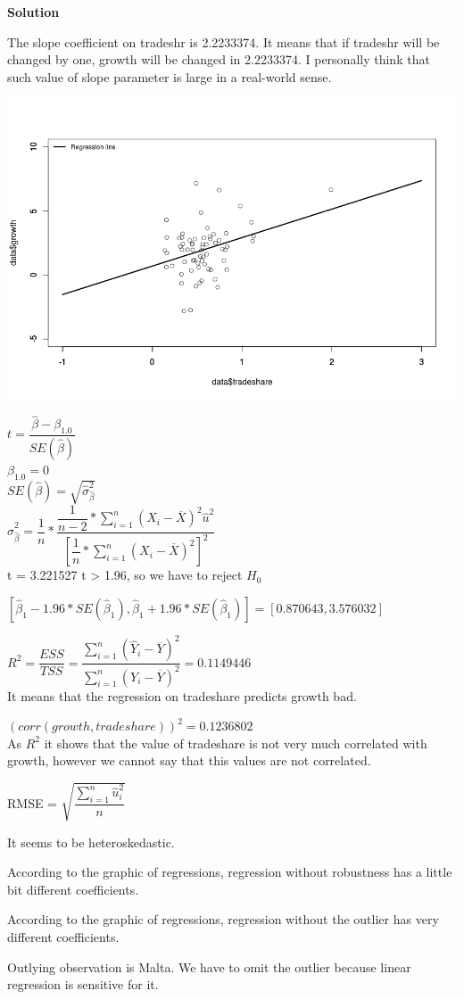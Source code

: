 \documentclass[12pt]{article}
\begin{document}
\textbf{Solution}

\begin{list}{)~}{}
\item
The slope coefficient on tradeshr is 2.2233374. It means that if tradeshr will be changed by one, growth will be changed in 2.2233374. I personally think that such value of slope parameter is large in a real-world sense.
\item
\includegraphics[width=1\textwidth]{Rplot.png}
\item
$t = \dfrac{\hat{\beta} - \beta_{1.0}}{SE(\hat{\beta})}$\\
$\beta_{1.0} = 0$\\
${SE(\hat{\beta})} = \sqrt{\hat{\sigma}^2_{\hat{\beta}}}$\\
$\hat{\sigma}^2_{\hat{\beta}} = \dfrac{1}{n} * \dfrac{\dfrac{1}{n-2} * \sum^{n}_{i = 1}(X_i - \overline{X})^2\hat{u}^2}{\left[\dfrac{1}{n} * \sum^{n}_{i = 1}(X_i-\overline{X})^2\right]^2}$\\
t = 3.221527 
t > 1.96, so we have to reject $H_0$
\item
$[\hat{\beta}_1 - 1.96*SE(\hat{\beta}_1),\hat{\beta}_1 + 1.96*SE(\hat{\beta}_1)] = [0.870643,3.576032]$
\item
$R^2 = \dfrac{ESS}{TSS} = \dfrac{\sum^{n}_{i=1}(\hat{Y}_i-\overline{Y})^2}{\sum^{n}_{i=1}(Y_i-\overline{Y})^2}=0.1149446$\\
It means that the regression on tradeshare predicts growth bad.
\item
$(corr(growth, tradeshare))^2 = 0.1236802$\\
As $R^2$
it shows that the value of tradeshare is not very much correlated with growth, however we cannot say that this values are not correlated.
\item
RMSE = $\sqrt{\dfrac{\sum^{n}_{i=1}\hat{u}^2_i}{n}}	$
\item
It seems to be heteroskedastic.
\item
According to the graphic of regressions, regression without robustness has a little bit different coefficients.
\item
According to the graphic of regressions, regression without the outlier has very different coefficients.
\item
Outlying observation is Malta. We have to omit the outlier because linear regression is sensitive for it.
\end{list}
\end{document}

